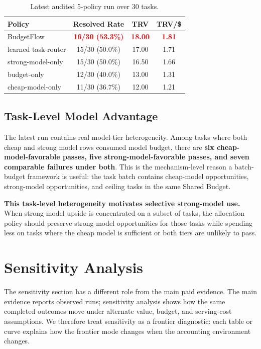 \documentclass[sigconf,review,anonymous]{acmart}
\newcommand{\method}{BudgetFlow\xspace}
\newcommand{\sharedbudget}{Shared Budget\xspace}
\newcommand{\pos}[1]{\textcolor{red}{\textbf{#1}}}
\begin{document}
\begin{table}[t]
\centering
\small
\begin{tabular}{lccc}
\toprule
Policy & Resolved Rate & TRV & TRV/\$ \\
\midrule
\method & \pos{16/30 (53.3\%)} & \pos{18.00} & \pos{1.81} \\
learned task-router & 15/30 (50.0\%) & 17.00 & 1.71 \\
strong-model-only & 15/30 (50.0\%) & 16.50 & 1.66 \\
budget-only & 12/30 (40.0\%) & 13.00 & 1.31 \\
cheap-model-only & 11/30 (36.7\%) & 12.00 & 1.21 \\
\bottomrule
\end{tabular}
\caption{Latest audited 5-policy run over 30 tasks.}
\label{tab:latest}
\end{table}

\subsection{Task-Level Model Advantage}
The latest run contains real model-tier heterogeneity. Among tasks where both cheap and strong model rows consumed model budget, there are \textbf{six cheap-model-favorable passes, five strong-model-favorable passes, and seven comparable failures under both}. This is the mechanism-level reason a batch-budget framework is useful: the task batch contains cheap-model opportunities, strong-model opportunities, and ceiling tasks in the same \sharedbudget.

\textbf{This task-level heterogeneity motivates selective strong-model use.} When strong-model upside is concentrated on a subset of tasks, the allocation policy should preserve strong-model opportunities for those tasks while spending less on tasks where the cheap model is sufficient or both tiers are unlikely to pass.

\section{Sensitivity Analysis}
\label{sec:sensitivity}
The sensitivity section has a different role from the main paid evidence. The main evidence reports observed runs; sensitivity analysis shows how the same completed outcomes move under alternate value, budget, and serving-cost assumptions. We therefore treat sensitivity as a frontier diagnostic: each table or curve explains how the frontier mode changes when the accounting environment changes.
\end{document}
